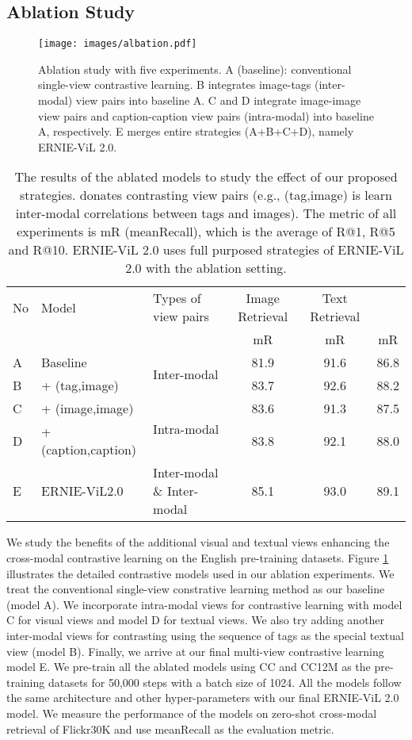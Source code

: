 \documentclass{article}
\begin{document}
\subsection{Ablation Study}
\begin{figure*}[]
\centering
\texttt{[image: images/albation.pdf]}
\caption{Ablation study with five experiments. A (baseline): conventional single-view contrastive learning. B integrates image-tags (inter-modal) view pairs into baseline A. C and D integrate image-image view pairs and caption-caption view pairs (intra-modal) into baseline A, respectively. E merges entire strategies (A+B+C+D), namely ERNIE-ViL 2.0. }
\label{ablation_1}
\end{figure*} 
\begin{table*}[]
\centering
\begin{tabular}{lll|c|c|c}
\toprule
No & Model & Types of view pairs & Image Retrieval & Text Retrieval &  \\ 
 &  &  & mR & mR & mR\\ \midrule
A & Baseline & \multirow{2}{*}{Inter-modal} & 81.9 & 91.6& 86.8  \\
B & + (tag,image) &  & 83.7 & 92.6& 88.2 \\ \midrule
C & + (image,image) & \multirow{2}{*}{Intra-modal} & 83.6 & 91.3 & 87.5\\
D & + (caption,caption) &  & 83.8 & 92.1& 88.0\\ \midrule
E & ERNIE-ViL2.0 & Inter-modal \& Inter-modal & 85.1 & 93.0 &89.1\\
\bottomrule
\end{tabular}
\caption{ The results of the ablated models to study the effect of our proposed strategies.  donates contrasting view pairs (e.g., (tag,image) is learn inter-modal correlations between tags and images). The metric of all experiments is mR (meanRecall), which is the average of R@1, R@5 and R@10.
ERNIE-ViL 2.0 uses full purposed strategies of ERNIE-ViL 2.0 with the ablation setting. }
\label{ablation_2}
\end{table*}
\label{sec:alabtion}
We study the benefits of the additional visual and textual views enhancing the cross-modal contrastive learning on the English pre-training datasets. Figure \ref{ablation_1} illustrates the detailed contrastive models used in our ablation experiments. We treat the conventional single-view constrative learning method as our baseline (model A). We incorporate intra-modal views for contrastive learning with model C for visual views and model D for textual views. We also try adding another inter-modal views for contrasting using the sequence of tags as the special textual view (model B). Finally, we arrive at our final multi-view contrastive learning model E. 
We pre-train all the ablated models using CC \cite{ng2020understanding} and CC12M \cite{changpinyo2021cc12m} as the pre-training datasets for 50,000 steps with a batch size of 1024. All the models follow the same architecture and other hyper-parameters with our final ERNIE-ViL 2.0 model. We measure the performance of the models on zero-shot cross-modal retrieval of Flickr30K and use meanRecall as the evaluation metric. 
\end{document}
